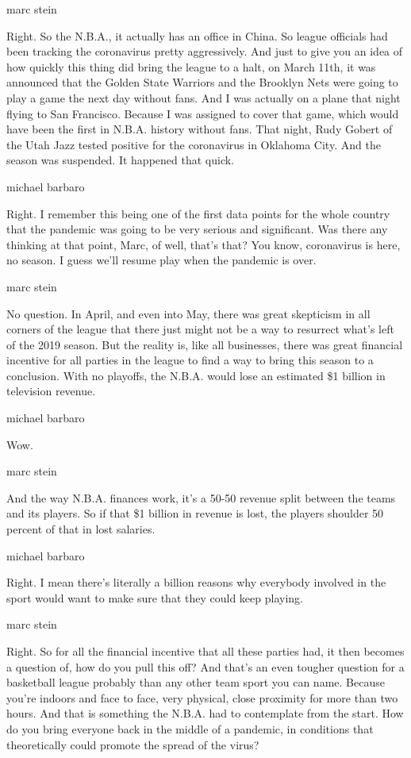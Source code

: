 marc stein

Right. So the N.B.A., it actually has an office in China. So league
officials had been tracking the coronavirus pretty aggressively. And
just to give you an idea of how quickly this thing did bring the league
to a halt, on March 11th, it was announced that the Golden State
Warriors and the Brooklyn Nets were going to play a game the next day
without fans. And I was actually on a plane that night flying to San
Francisco. Because I was assigned to cover that game, which would have
been the first in N.B.A. history without fans. That night, Rudy Gobert
of the Utah Jazz tested positive for the coronavirus in Oklahoma City.
And the season was suspended. It happened that quick.

michael barbaro

Right. I remember this being one of the first data points for the whole
country that the pandemic was going to be very serious and significant.
Was there any thinking at that point, Marc, of well, that's that? You
know, coronavirus is here, no season. I guess we'll resume play when the
pandemic is over.

marc stein

No question. In April, and even into May, there was great skepticism in
all corners of the league that there just might not be a way to
resurrect what's left of the 2019 season. But the reality is, like all
businesses, there was great financial incentive for all parties in the
league to find a way to bring this season to a conclusion. With no
playoffs, the N.B.A. would lose an estimated \$1 billion in television
revenue.

michael barbaro

Wow.

marc stein

And the way N.B.A. finances work, it's a 50-50 revenue split between the
teams and its players. So if that \$1 billion in revenue is lost, the
players shoulder 50 percent of that in lost salaries.

michael barbaro

Right. I mean there's literally a billion reasons why everybody involved
in the sport would want to make sure that they could keep playing.

marc stein

Right. So for all the financial incentive that all these parties had, it
then becomes a question of, how do you pull this off? And that's an even
tougher question for a basketball league probably than any other team
sport you can name. Because you're indoors and face to face, very
physical, close proximity for more than two hours. And that is something
the N.B.A. had to contemplate from the start. How do you bring everyone
back in the middle of a pandemic, in conditions that theoretically could
promote the spread of the virus?

